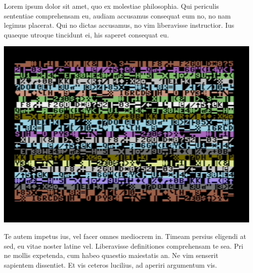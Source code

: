 \begin{minipage}{0.4\textwidth}
Lorem ipsum dolor sit amet, quo ex molestiae philosophia. Qui periculis sententiae comprehensam eu, audiam accusamus consequat eum no, no nam legimus placerat. Qui no dictas accusamus, no vim liberavisse instructior. Ius quaeque utroque tincidunt ei, his saperet consequat eu.
\end{minipage}
\begin{minipage}{0.6\textwidth}
\includegraphics{images/c64/04_randomness.png}
\end{minipage}
Te autem impetus ius, vel facer omnes mediocrem in. Timeam persius eligendi at sed, eu vitae noster latine vel. Liberavisse definitiones comprehensam te sea. Pri ne mollis expetenda, cum habeo quaestio maiestatis an. Ne vim senserit sapientem dissentiet. Et vis ceteros lucilius, ad aperiri argumentum vis.


